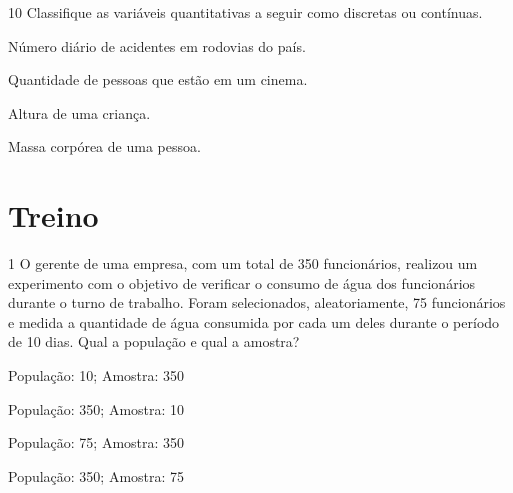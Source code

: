 \num{10} Classifique as variáveis quantitativas a seguir como discretas
ou contínuas.


\begin{escolha}
\item
  Número diário de acidentes em rodovias do país.


\item
  Quantidade de pessoas que estão em um cinema.


\item
  Altura de uma criança.


\item
  Massa corpórea de uma pessoa.

\end{escolha}

\section{Treino}

\num{1} O gerente de uma empresa, com um total de 350 funcionários,
realizou um experimento com o objetivo de verificar o consumo de água
dos funcionários durante o turno de trabalho. Foram selecionados,
aleatoriamente, 75 funcionários e medida a quantidade de água consumida
por cada um deles durante o período de 10 dias. Qual a população e qual
a amostra?

\begin{minipage}{.5\textwidth}
\begin{escolha}
\item
  População: 10; Amostra: 350
\item
  População: 350; Amostra: 10
\item
  População: 75; Amostra: 350
\item
  População: 350; Amostra: 75
\end{escolha}
\end{minipage}

